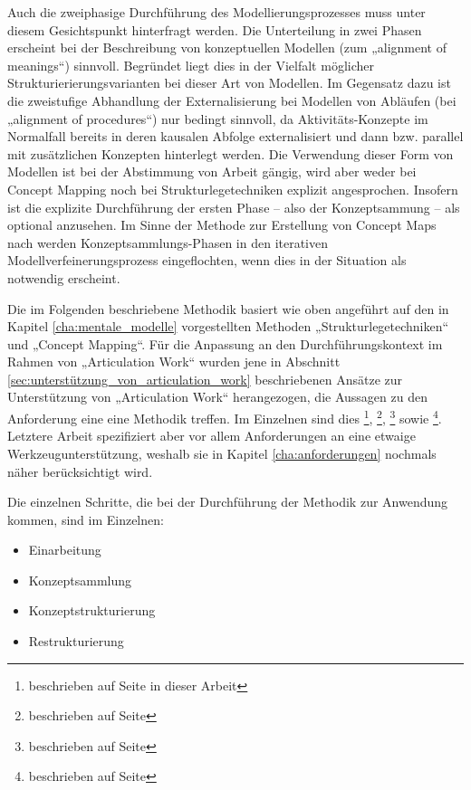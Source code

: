 Auch die zweiphasige Durchführung des Modellierungsprozesses muss unter diesem Gesichtspunkt hinterfragt werden. Die Unterteilung in zwei Phasen erscheint bei der Beschreibung von konzeptuellen Modellen (zum „alignment of meanings“) sinnvoll. Begründet liegt dies in der Vielfalt möglicher Strukturierierungsvarianten bei dieser Art von Modellen. Im Gegensatz dazu ist die zweistufige Abhandlung der Externalisierung bei Modellen von Abläufen (bei „alignment of procedures“) nur bedingt sinnvoll, da Aktivitäts-Konzepte im Normalfall bereits in deren kausalen Abfolge externalisiert und dann bzw. parallel mit zusätzlichen Konzepten hinterlegt werden. Die Verwendung dieser Form von Modellen ist bei der Abstimmung von Arbeit gängig, wird aber weder bei Concept Mapping noch bei Strukturlegetechniken explizit angesprochen. Insofern ist die explizite Durchführung der ersten Phase -- also der Konzeptsammung -- als optional anzusehen. Im Sinne der Methode zur Erstellung von Concept Maps nach \citet{Novak06} werden Konzeptsammlungs-Phasen in den iterativen Modellverfeinerungsprozess eingeflochten, wenn dies in der Situation als notwendig erscheint.

Die im Folgenden beschriebene Methodik basiert wie oben angeführt auf den in Kapitel \ref{cha:mentale_modelle} vorgestellten Methoden „Strukturlegetechniken“ und „Concept Mapping“. Für die Anpassung an den Durchführungskontext im Rahmen von „Articulation Work“ wurden jene in Abschnitt \ref{sec:unterstützung_von_articulation_work} beschriebenen Ansätze zur Unterstützung von „Articulation Work“ herangezogen, die Aussagen zu den Anforderung eine eine Methodik treffen. Im Einzelnen sind dies \citet{Corbin93}\footnote{beschrieben auf Seite \pageref{steps:corbin} in dieser Arbeit}, \citet{Jorgensen04}\footnote{beschrieben auf Seite \pageref{steps:jorgensen}}, \citet{Cabitza06}\footnote{beschrieben auf Seite \pageref{steps:cabitza}} sowie \citet{Herrmann02}\footnote{beschrieben auf Seite \pageref{steps:herrmann}}. Letztere Arbeit spezifiziert aber vor allem Anforderungen an eine etwaige Werkzeugunterstützung, weshalb sie in Kapitel \ref{cha:anforderungen} nochmals näher berücksichtigt wird.

Die einzelnen Schritte, die bei der Durchführung der Methodik zur Anwendung kommen, sind im Einzelnen:
\begin{itemize}
 \item Einarbeitung
 \item Konzeptsammlung 
 \item Konzeptstrukturierung
 \item Restrukturierung
\end{itemize}

